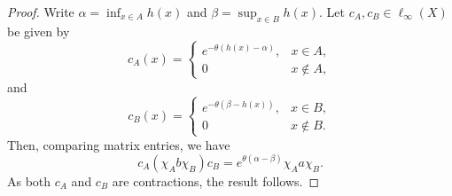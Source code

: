 \documentclass[11pt]{amsart}
\numberwithin{equation}{section}
\theoremstyle{definition}
\theoremstyle{remark}
\begin{document}
\begin{proof}
Write  $\alpha=\inf_{x\in A}h(x)$ and $\beta=\sup_{x\in B}h(x)$. Let $c_A,c_B\in \ell_\infty(X)$ be given by
\[c_A(x)=\left\{\begin{array}{cc}
 e^{-\theta(h(x)-\alpha)}  ,  & x\in A, \\
  0   & x\not\in A,
\end{array}\right.\] and \[  c_B(x)=\left\{\begin{array}{cc}
 e^{-\theta(\beta-h(x))} ,  & x\in B, \\
  0   & x\not\in B.
\end{array}\right.\] Then, comparing matrix entries, we have
\[c_A\left(\chi_Ab\chi_B\right)c_B=e^{\theta(\alpha-\beta)}\chi_Aa\chi_B.\]
As both $c_A$ and $c_B$ are contractions,   the result follows.
\end{proof}
\end{document}
